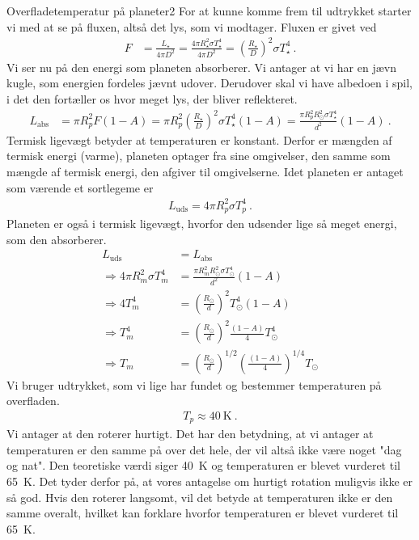 \begin{opgave}{Overfladetemperatur på planeter}{2}
\opg For at kunne komme frem til udtrykket starter vi med at se på fluxen, altså det lys, som vi modtager. Fluxen er givet ved
 \begin{align*}
 F &= \frac{L_\star}{4\pi D^2} = \frac{4\pi R_\star^2 \sigma T_\star^4}{4\pi D^2} = \left( \frac{R_\star}{D}\right) ^2 \sigma T_\star^4 \: .
 \end{align*}
 Vi ser nu på den energi som planeten absorberer. Vi antager at vi har en jævn kugle, som energien fordeles jævnt udover. Derudover skal vi have albedoen i spil, i det den fortæller os hvor meget lys, der bliver reflekteret. 
 \begin{align*}
 L_\text{abs} &= \pi R_{p}^2 F \left( 1-A\right) = \pi R_{p}^2 \left( \frac{R_\star}{D}\right) ^2 \sigma T_\star^4 \left( 1-A\right) = \frac{\pi R_p^2R_\odot^2 \sigma T_\star^4}{d^2} \left( 1-A\right) \: .
 \end{align*}
\opg Termisk ligevægt betyder at temperaturen er konstant. Derfor er mængden af termisk energi (varme), planeten optager fra sine omgivelser, den samme som mængde af termisk energi, den afgiver til omgivelserne.
\opg Idet planeten er antaget som værende et sortlegeme er
\begin{align*}
 L_\text{uds} = 4\pi R_p^2 \sigma T_p^4 \: .
 \end{align*}
Planeten er også i termisk ligevægt, hvorfor den udsender lige så meget energi, som den absorberer. 
 \begin{align*}
 L_\text{uds} &= L_\text{abs} \\
 \Rightarrow 4\pi R_m^2 \sigma T_m^4 &= \frac{\pi R_m^2R_\odot^2 \sigma T_\odot^4}{d^2} \left( 1-A\right) \\
 \Rightarrow 4T_m^4 &= \left( \frac{R_\odot}{d} \right) ^2 T_\odot^4 \left( 1-A\right) \\
 \Rightarrow T_m^4 &= \left( \frac{R_\odot}{d} \right) ^2 \frac{\left( 1-A\right)}{4} T_\odot^4\\ 
 \Rightarrow T_m &= \left( \frac{R_\odot}{d} \right) ^{1/2} \left( \frac{\left( 1-A \right) }{4} \right) ^{1/4} T_\odot
 \end{align*}
 \opg Vi bruger udtrykket, som vi lige har fundet og bestemmer temperaturen på overfladen. 
 \begin{align*}
 T_p \approx \SI{40}{\kelvin} \: .
 \end{align*}
 Vi antager at den roterer hurtigt. Det har den betydning, at vi antager at temperaturen er den samme på over det hele, der vil altså ikke være noget "dag og nat". Den teoretiske værdi siger \SI{40}{\kelvin} og temperaturen er blevet vurderet til \SI{65}{\kelvin}. Det tyder derfor på, at vores antagelse om hurtigt rotation muligvis ikke er så god. Hvis den roterer langsomt, vil det betyde at temperaturen ikke er den samme overalt, hvilket kan forklare hvorfor temperaturen er blevet vurderet til \SI{65}{\kelvin}. %
\end{opgave}
